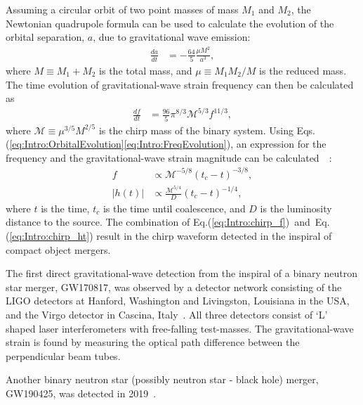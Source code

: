 \documentclass[../Thesis.tex]{subfiles}
\begin{document}
    Assuming a circular orbit of two point masses of mass $M_1$ and $M_2$, the Newtonian quadrupole formula can be used to calculate the evolution of the orbital separation, $a$, due to gravitational wave emission:~\cite[e.g.,][]{Cutler1994}
    \begin{align}
        \frac{da}{dt} & = -\frac{64}{5}\frac{\mu M^2}{a^3}, \label{eq:Intro:OrbitalEvolution}        
    \end{align}
    where  $M \equiv M_1 + M_2$ is the total mass, and $\mu \equiv M_1 M_2 / M$ is the reduced mass.
    The time evolution of gravitational-wave strain frequency can then be calculated as
    \begin{align}
        \frac{df}{dt} & = \frac{96}{5}\pi^{8/3}\mathcal{M}^{5/3}f^{11/3}, \label{eq:Intro:FreqEvolution}        
    \end{align}   
    where $\mathcal{M} \equiv \mu^{3/5} M^{2/5}$ is the chirp mass of the binary system. 
    Using Eqs.(\ref{eq:Intro:OrbitalEvolution}\Hyphdash*\ref{eq:Intro:FreqEvolution}), an expression for the frequency and the gravitational-wave strain magnitude can be calculated~~\cite[e.g.,][]{Cutler1994}: 
      \begin{align}
      f &  \propto \mathcal{M}^{- 5/8}(t_c-t)^{- 3/8},\label{eq:Intro:chirp_f}\\
        |h(t)| & \propto  \frac{\mathcal{M}^{5/4}}{D}(t_c-t)^{-1/4}, \label{eq:Intro:chirp_ht} 
    \end{align}
    where $t$ is the time, $t_c$ is the time until coalescence, and $D$ is the luminosity distance to the source. 
    The combination of Eq.(\ref{eq:Intro:chirp_f})~and~Eq.(\ref{eq:Intro:chirp_ht}) result in the chirp waveform detected in the inspiral of compact object mergers.
    \par
    The first direct gravitational-wave detection from the inspiral of a binary neutron star merger, GW170817, was observed by a detector network consisting of the LIGO detectors at Hanford, Washington and Livingston, Louisiana in the USA, and the Virgo detector in Cascina, Italy~\cite{AdvancedLIGO2015,AdvancedVirgo2015,GW170817Detection}. 
    All three detectors consist of `L' shaped laser interferometers with free-falling test-masses.
    The gravitational-wave strain is found by measuring the optical path difference between the perpendicular beam tubes. \par
    
    Another binary neutron star (possibly neutron star - black hole) merger, GW190425, was detected in 2019~\cite{GW190425Detection,GWTC2,PopGWTC2}.
\end{document}
